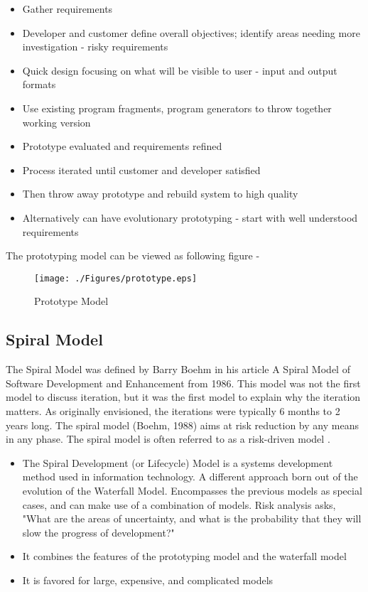 \begin{itemize}
    \item {Gather requirements}
    \item {Developer and customer define overall objectives; identify
areas needing more investigation - risky requirements}
    \item {Quick design focusing on what will be visible to
user - input and output formats}
    \item {Use existing program fragments, program
generators to throw together working version}
    \item {Prototype evaluated and requirements
refined}
    \item {Process iterated until customer and
developer satisfied}
    \item {Then throw away prototype
and rebuild system to high quality}
    \item {Alternatively can have
evolutionary prototyping - start with well understood
requirements}
\end{itemize}

The prototyping model can be viewed as following figure
\citep{gelbard2002integrating}-


\begin{figure}[htbp]
  \centering
\texttt{[image: ./Figures/prototype.eps]}
  \caption[Prototype Model]{Prototype Model}
  \label{fig:Prototype}
\end{figure}

\subsection{Spiral Model}
The Spiral Model was defined by Barry Boehm in his article A
Spiral Model of Software Development and Enhancement from 1986.
This model was not the first model to discuss iteration, but it
was the first model to explain why the iteration matters. As
originally envisioned, the iterations were typically 6 months to 2
years long. The spiral model (Boehm, 1988) aims at risk reduction
by any means in any phase. The spiral model is often referred to
as a risk-driven model \citep{boehm1998using}.



\begin{itemize}
    \item { The Spiral Development (or Lifecycle) Model is a systems
development method used in information technology. A different
approach born out of the evolution of the Waterfall Model.
Encompasses the previous models as special cases, and can make use
of a combination of models. Risk analysis asks, "What are the
areas of uncertainty, and what is the probability that they will
slow the progress of development?"}
    \item {It combines the features of the prototyping model and the
waterfall model}
    \item {It is favored for large, expensive, and complicated
models}
\end{itemize}


